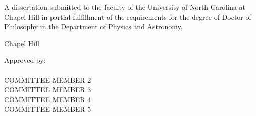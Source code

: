 \begin{titlepage}
\begin{center}

\vspace{2in}
\begin{singlespace}
\large %
\MakeUppercase{\mytitle}
\end{singlespace}


\vspace{61pt} %
\large \myname



\vspace{61pt}
\begin{singlespace}
\noindent \large
A dissertation submitted to the faculty of the University of North Carolina at Chapel Hill
in partial fulfillment of the requirements for the degree of 
Doctor of Philosophy 
in the 
Department of Physics and Astronomy.
\end{singlespace}


\vspace{61pt}
\begin{singlespace} \large
Chapel Hill\\
\myyear
\end{singlespace}
\end{center}



\vspace{40pt}
\begin{flushright}
\newlength{\mycommitteelength}
\settowidth{\mycommitteelength}{LONGEST NAME GOES HERE}
\begin{minipage}[t]{\mycommitteelength} \large
Approved by:\\
\myadvisor \\
COMMITTEE MEMBER 2 \\
COMMITTEE MEMBER 3 \\
COMMITTEE MEMBER 4 \\
COMMITTEE MEMBER 5
\end{minipage}
\end{flushright}

\end{titlepage}
\clearpage